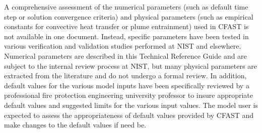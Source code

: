 A comprehensive assessment of the numerical parameters (such as default time step or solution convergence criteria) and physical parameters (such as empirical constants for convective heat transfer or plume entrainment) used in CFAST is not available in one document. Instead, specific parameters have been tested in various verification and validation studies performed at NIST and elsewhere. Numerical parameters are described in this Technical Reference Guide and are subject to the internal review process at NIST, but many physical parameters are extracted from the literature and do not undergo a formal review. In addition, default values for the various model inputs have been specifically reviewed by a professional fire protection engineering university professor to insure appropriate default values and suggested limits for the various input values. The model user is expected to assess the appropriateness of default values provided by CFAST and make changes to the default values if need be.

